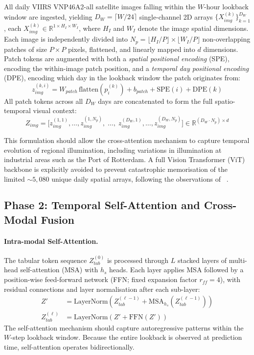 All daily VIIRS VNP46A2-all satellite images falling within the $W$-hour lookback window are ingested, yielding $D_W = \lceil W / 24 \rceil$ single-channel 2D arrays $\{X_{img}^{(k)}\}_{k=1}^{D_W}$, each $X_{img}^{(k)} \in \mathbb{R}^{1 \times H_I \times W_I}$, where $H_I$ and $W_I$ denote the image spatial dimensions. Each image is independently divided into $N_p = \lfloor H_I/P \rfloor \times \lfloor W_I/P \rfloor$ non-overlapping patches of size $P \times P$ pixels, flattened, and linearly mapped into $d$ dimensions. Patch tokens are augmented with both a \textit{spatial positional encoding} (SPE), encoding the within-image patch position, and a \textit{temporal day positional encoding} (DPE), encoding which day in the lookback window the patch originates from:
    \begin{equation}
        z_{img}^{(k,i)} = W_{patch}\,\text{flatten}(p_i^{(k)})
        + b_{patch} + \text{SPE}(i) + \text{DPE}(k)
    \end{equation}
    All patch tokens across all $D_W$ days are concatenated to form the
    full spatio-temporal visual context:
    \begin{equation}
        Z_{img} = \bigl[z_{img}^{(1,1)},\ldots,z_{img}^{(1,N_p)},
        \;\ldots,\;
        z_{img}^{(D_W,1)},\ldots,z_{img}^{(D_W,N_p)}\bigr]
        \in \mathbb{R}^{(D_W \cdot N_p) \times d}
    \end{equation}

This formulation should allow the cross-attention mechanism to capture temporal evolution of regional illumination, including variations in illumination at industrial areas such as the Port of Rotterdam. A full Vision Transformer (ViT) backbone is explicitly avoided to prevent catastrophic memorisation of the limited ${\sim}5{,}080$ unique daily spatial arrays, following the observations of ~\cite{schubnel_solarcrossformer_2025}.

\subsection{Phase 2: Temporal Self-Attention and Cross-Modal Fusion}

\paragraph{Intra-modal Self-Attention.}
The tabular token sequence $Z_{tab}^{(0)}$ is processed through $L$ stacked layers of multi-head self-attention (MSA) with $h_s$ heads. Each layer applies MSA followed by a position-wise feed-forward network (FFN; fixed expansion factor $r_{ff} = 4$), with residual connections and layer normalisation after each sub-layer:
\begin{align}
    Z' &= \text{LayerNorm}\!\left(
        Z_{tab}^{(\ell-1)} + \text{MSA}_{h_s}\!\left(
        Z_{tab}^{(\ell-1)}\right)\right) \\
    Z_{tab}^{(\ell)} &= \text{LayerNorm}\!\left(
        Z' + \text{FFN}(Z')\right)
\end{align}
The self-attention mechanism should capture autoregressive patterns within the $W$-step lookback window. Because the entire lookback is observed at prediction time, self-attention operates bidirectionally.

